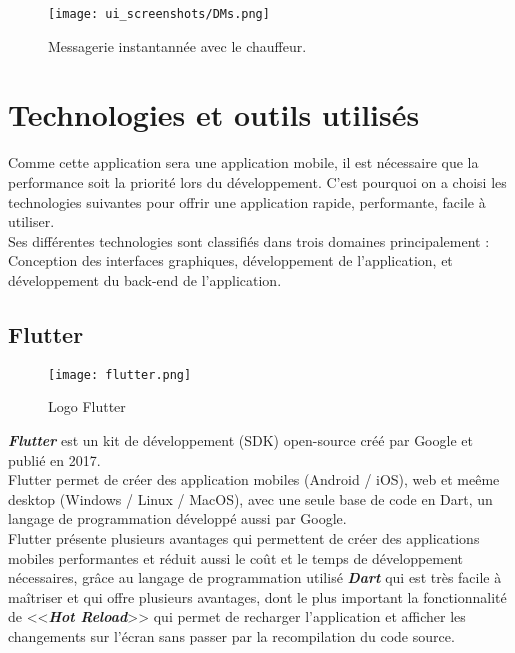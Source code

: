\vspace{1cm}
\begin{figure}[H]
    \centering
    \texttt{[image: ui\_screenshots/DMs.png]}
    \vspace{1cm}
    \caption{\centering Messagerie instantannée avec le chauffeur.}
    \label{fig:dms}
\end{figure}
\section{Technologies et outils utilisés}
Comme cette application sera une application mobile, il est nécessaire que la performance soit la priorité lors du développement. C'est pourquoi on a choisi les technologies suivantes pour offrir une application rapide, performante, facile à utiliser.\\
\noindent Ses différentes technologies sont classifiés dans trois domaines principalement : Conception des interfaces graphiques, développement de l'application, et développement du back-end de l'application.\\
\subsection{Flutter}
\vspace{1cm}
\begin{figure}[H]
    \centering
    \texttt{[image: flutter.png]}
    \vspace{1cm}
    \captionsetup{justification=centering}

    \caption{Logo Flutter}
    \label{fig:flutter_logo}
\end{figure}
\textit{\textbf{Flutter}} \cite{flutter} est un kit de développement (SDK) open-source créé par Google et publié en 2017.\\
\noindent Flutter permet de créer des application mobiles (Android / iOS), web et meême desktop (Windows / Linux / MacOS), avec une seule base de code en Dart, un langage de programmation développé aussi par Google. \\
\noindent Flutter présente plusieurs avantages qui permettent de créer des applications mobiles performantes et réduit aussi le coût et le temps de développement nécessaires, grâce au langage de programmation utilisé \textit{\textbf{Dart}} qui est très facile à maîtriser et qui offre plusieurs avantages, dont le plus important la fonctionnalité de <<\textit{\textbf{Hot Reload}}>> qui permet de recharger l'application et afficher les changements sur l'écran sans passer par la recompilation du code source.
